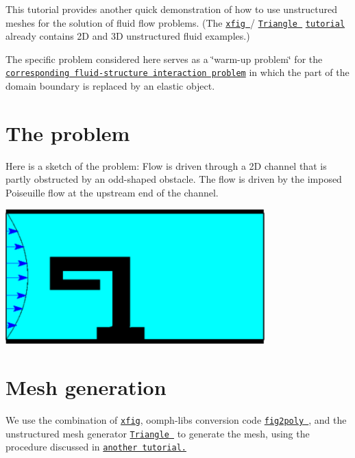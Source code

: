 This tutorial provides another quick demonstration of how to use unstructured meshes for the solution of fluid flow problems. (The \href{http://en.wikipedia.org/wiki/Xfig}{\tt xfig }/ \href{http://www.cs.cmu.edu/~quake/triangle.html}{\tt {\ttfamily Triangle} } \href{../../../meshes/mesh_from_xfig/html/index.html}{\tt tutorial} already contains 2D and 3D unstructured fluid examples.)

The specific problem considered here serves as a \char`\"{}warm-\/up problem\char`\"{} for the \href{../../../interaction/unstructured_fsi/html/index.html}{\tt corresponding fluid-\/structure interaction problem} in which the part of the domain boundary is replaced by an elastic object.



 

\hypertarget{index_problem}{}\section{The problem}\label{index_problem}
Here is a sketch of the problem\+: Flow is driven through a 2D channel that is partly obstructed by an odd-\/shaped obstacle. The flow is driven by the imposed Poiseuille flow at the upstream end of the channel.

 
\begin{DoxyImage}
\includegraphics[width=0.75\textwidth]{fluid_sketch}
\end{DoxyImage}




 

\hypertarget{index_mesh}{}\section{Mesh generation}\label{index_mesh}
We use the combination of \href{http://en.wikipedia.org/wiki/Xfig}{\tt xfig}, {\ttfamily oomph-\/lib\textquotesingle{}s} conversion code \href{../../../meshes/mesh_from_xfig/html/index.html}{\tt {\ttfamily fig2poly} }, and the unstructured mesh generator \href{http://www.cs.cmu.edu/~quake/triangle.html}{\tt {\ttfamily Triangle} } to generate the mesh, using the procedure discussed in \href{../../../meshes/mesh_from_xfig/html/index.html}{\tt another tutorial.}

